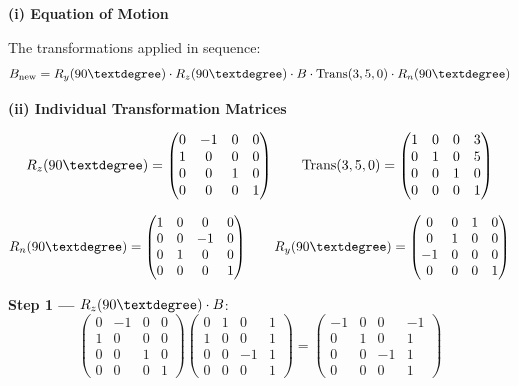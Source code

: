 \documentclass[12pt,a3paper]{article}
\begin{document}
\begin{enumerate}
\begin{tcolorbox}[enhanced,breakable,ansbox,colback=cB!4,colframe=cB,
  boxrule=0.8pt,arc=5pt,
  title={\textbf{Solution}},fonttitle=\bfseries\color{white},
  colbacktitle=cB]

\textbf{(i) Equation of Motion}

The transformations applied in sequence:
\[
  B_{\text{new}} = R_y(90\textdegree)\cdot R_z(90\textdegree)\cdot B
                   \cdot \mathrm{Trans}(3,5,0)\cdot R_n(90\textdegree)
\]

\medskip
\textbf{(ii) Individual Transformation Matrices}

\[
  R_z(90\textdegree) =
  \begin{pmatrix}0&-1&0&0\\1&0&0&0\\0&0&1&0\\0&0&0&1\end{pmatrix}
  \qquad
  \mathrm{Trans}(3,5,0) =
  \begin{pmatrix}1&0&0&3\\0&1&0&5\\0&0&1&0\\0&0&0&1\end{pmatrix}
\]

\[
  R_n(90\textdegree) =
  \begin{pmatrix}1&0&0&0\\0&0&-1&0\\0&1&0&0\\0&0&0&1\end{pmatrix}
  \qquad
  R_y(90\textdegree) =
  \begin{pmatrix}0&0&1&0\\0&1&0&0\\-1&0&0&0\\0&0&0&1\end{pmatrix}
\]

\medskip
\textbf{Step 1 —} $R_z(90\textdegree)\cdot B$:
\[
  \begin{pmatrix}0&-1&0&0\\1&0&0&0\\0&0&1&0\\0&0&0&1\end{pmatrix}
  \begin{pmatrix}0&1&0&1\\1&0&0&1\\0&0&{-1}&1\\0&0&0&1\end{pmatrix}
  =
  \begin{pmatrix}-1&0&0&-1\\0&1&0&1\\0&0&{-1}&1\\0&0&0&1\end{pmatrix}
\]


\end{tcolorbox}
\end{enumerate}
\end{document}
